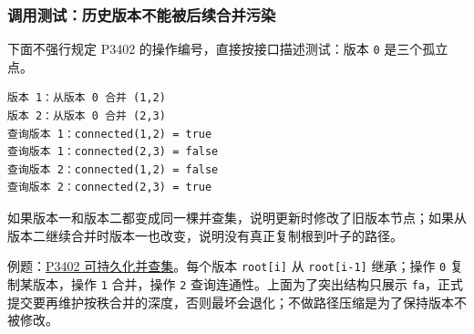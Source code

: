 \subsubsection{调用测试：历史版本不能被后续合并污染}

下面不强行规定 P3402 的操作编号，直接按接口描述测试：版本 \passthrough{\lstinline!0!} 是三个孤立点。

\begin{lstlisting}
版本 1：从版本 0 合并 (1,2)
版本 2：从版本 0 合并 (2,3)
查询版本 1：connected(1,2) = true
查询版本 1：connected(2,3) = false
查询版本 2：connected(1,2) = false
查询版本 2：connected(2,3) = true
\end{lstlisting}

如果版本一和版本二都变成同一棵并查集，说明更新时修改了旧版本节点；如果从版本二继续合并时版本一也改变，说明没有真正复制根到叶子的路径。

例题：\href{https://www.luogu.com.cn/problem/P3402}{P3402 可持久化并查集}。每个版本 \passthrough{\lstinline!root[i]!} 从 \passthrough{\lstinline!root[i-1]!} 继承；操作 \passthrough{\lstinline!0!} 复制某版本，操作 \passthrough{\lstinline!1!} 合并，操作 \passthrough{\lstinline!2!} 查询连通性。上面为了突出结构只展示 \passthrough{\lstinline!fa!}，正式提交要再维护按秩合并的深度，否则最坏会退化；不做路径压缩是为了保持版本不被修改。
